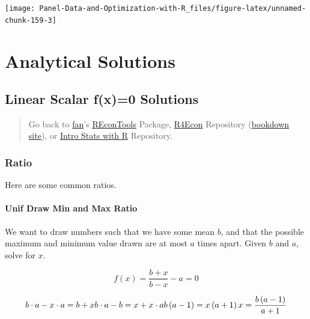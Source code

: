 \documentclass[
]{book}
\begin{document}
\begin{center}\texttt{[image: Panel-Data-and-Optimization-with-R\_files/figure-latex/unnamed-chunk-159-3]} \end{center}

\hypertarget{analytical-solutions}{%
\section{Analytical Solutions}\label{analytical-solutions}}

\hypertarget{linear-scalar-fx0-solutions}{%
\subsection{Linear Scalar f(x)=0 Solutions}\label{linear-scalar-fx0-solutions}}

\begin{quote}
Go back to \href{http://fanwangecon.github.io/}{fan}'s \href{https://fanwangecon.github.io/REconTools/}{REconTools} Package, \href{https://fanwangecon.github.io/R4Econ/}{R4Econ} Repository (\href{https://fanwangecon.github.io/R4Econ/bookdown}{bookdown site}), or \href{https://fanwangecon.github.io/Stat4Econ/}{Intro Stats with R} Repository.
\end{quote}

\hypertarget{ratio}{%
\subsubsection{Ratio}\label{ratio}}

Here are some common ratios.

\hypertarget{unif-draw-min-and-max-ratio}{%
\paragraph{Unif Draw Min and Max Ratio}\label{unif-draw-min-and-max-ratio}}

We want to draw numbers such that we have some mean \(b\), and that the possible maximum and minimum value drawn are at most \(a\) times apart. Given \(b\) and \(a\), solve for \(x\).

\[
f(x) = \frac{b+x}{b-x} - a = 0
\]

\[
b \cdot a - x \cdot a = b + x \\
b \cdot a - b = x + x \cdot a  \\
b \left(a - 1\right) = x \left( a+ 1\right)  \\
x = \frac{b\left(a-1\right)}{a+1}\\
\]
\end{document}
